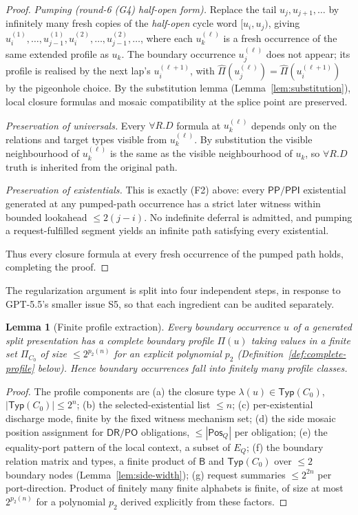 \documentclass[11pt]{article}
\newtheorem{lemma}[theorem]{Lemma}
\newcommand{\Base}{\mathsf{B}}
\newcommand{\DR}{\mathsf{DR}}
\newcommand{\PO}{\mathsf{PO}}
\newcommand{\PP}{\mathsf{PP}}
\newcommand{\PPI}{\mathsf{PPI}}
\newcommand{\Typ}{\mathsf{Typ}}
\newcommand{\Pos}{\mathsf{Pos}}
\newcommand{\extProf}{\widehat\Pi}
\begin{document}
\begin{proof}
\emph{Pumping (round-6 (G4) half-open form).}  Replace the tail
$u_j,u_{j+1},\ldots$ by infinitely many fresh copies of the
\emph{half-open} cycle word $[u_i,u_j)$, giving
$u_i^{(1)},\ldots,u_{j-1}^{(1)},u_i^{(2)},\ldots,u_{j-1}^{(2)},
\ldots$, where each $u_k^{(\ell)}$ is a fresh occurrence of the
same extended profile as $u_k$.  The boundary occurrence
$u_j^{(\ell)}$ does not appear; its profile is realised by the
next lap's $u_i^{(\ell+1)}$, with
$\extProf(u_j^{(\ell)})=\extProf(u_i^{(\ell+1)})$ by the
pigeonhole choice.  By the substitution lemma
(Lemma~\ref{lem:substitution}), local closure formulas and mosaic
compatibility at the splice point are preserved.

\emph{Preservation of universals.}  Every $\forall R.D$ formula at
$u_k^{(\ell)}$ depends only on the relations and target types
visible from $u_k^{(\ell)}$.  By substitution the visible
neighbourhood of $u_k^{(\ell)}$ is the same as the visible
neighbourhood of $u_k$, so $\forall R.D$ truth is inherited from the
original path.

\emph{Preservation of existentials.}  This is exactly (F2) above:
every $\PP/\PPI$ existential generated at any pumped-path occurrence
has a strict later witness within bounded lookahead $\le 2(j-i)$.
No indefinite deferral is admitted, and pumping a request-fulfilled
segment yields an infinite path satisfying every existential.

Thus every closure formula at every fresh occurrence of the pumped
path holds, completing the proof.
\end{proof}

The regularization argument is split into four independent steps,
in response to GPT-5.5's smaller issue S5, so that each ingredient
can be audited separately.

\begin{lemma}[Finite profile extraction]\label{lem:profile-extraction}
Every boundary occurrence $u$ of a generated split presentation has
a complete boundary profile $\Pi(u)$ taking values in a finite set
$\Pi_{C_0}$ of size $\le 2^{p_2(n)}$ for an explicit polynomial
$p_2$ (Definition~\ref{def:complete-profile} below).  Hence
boundary occurrences fall into finitely many profile classes.
\end{lemma}

\begin{proof}
The profile components are (a) the closure type $\lambda(u)
\in\Typ(C_0)$, $|\Typ(C_0)|\le 2^n$; (b) the selected-existential
list $\le n$; (c) per-existential discharge mode, finite by the
fixed witness mechanism set; (d) the side mosaic position assignment
for $\DR/\PO$ obligations, $\le|\Pos_Q|$ per obligation; (e) the
equality-port pattern of the local context, a subset of
$E_Q$; (f) the boundary relation matrix and types, a finite product
of $\Base$ and $\Typ(C_0)$ over $\le 2$ boundary nodes
(Lemma~\ref{lem:side-width}); (g) request summaries $\le 2^{2n}$
per port-direction.  Product of finitely many finite alphabets is
finite, of size at most $2^{p_2(n)}$ for a polynomial $p_2$ derived
explicitly from these factors.
\end{proof}
\end{document}
